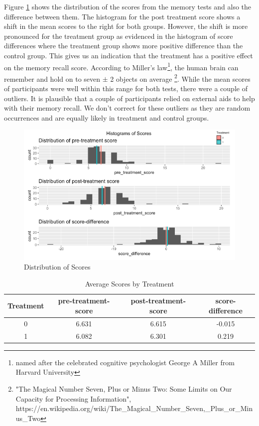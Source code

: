 \documentclass[journal,onecolumn, 12pt]{article}
\begin{document}
\noindent
Figure \ref{fig: Histogram} shows the distribution of the scores from the memory tests and also the difference between them. The histogram for the post treatment score shows a shift in the mean scores to the right for both groups. However, the shift is more pronounced for the treatment group as evidenced in the histogram of score differences where the treatment group shows more positive difference than the control group. This gives us an indication that the treatment has a positive effect on the memory recall score. According to Miller's law\footnote {named after the celebrated cognitive psychologist George A Miller from Harvard University}, the human brain can remember and hold on to seven $\pm$ 2 objects on average \footnote {"The Magical Number Seven, Plus or Minus Two: Some Limits on Our Capacity for Processing Information", https://en.wikipedia.org/wiki/The\_Magical\_Number\_Seven,\_Plus\_or\_Minus\_Two}. While the mean scores of participants were well within this range for both tests, there were a couple of outliers. It is plausible that a couple of participants relied on external aids to help with their memory recall.  We don't correct for these outliers as they are random occurrences and are equally likely in treatment and control groups. \\

\begin{figure}[h]
    \centering
    \includegraphics[width=\columnwidth]{images/Histogram.png}
    \caption{Distribution of Scores}
    \label{fig: Histogram}
\end{figure}

\begin{table}[h]
\begin{center}
 \begin{tabular}{||c c c c||} 
 \hline
 Treatment & pre-treatment-score & post-treatment-score	& score-difference \\  
 \hline\hline
 0 & 6.631 & 6.615 & -0.015 \\ \hline
 1 & 6.082 & 6.301 & 0.219 \\ \hline
\end{tabular}
\caption{Average Scores by Treatment}
\label{table: meanscores}
\end{center}
\end{table}
\end{document}
